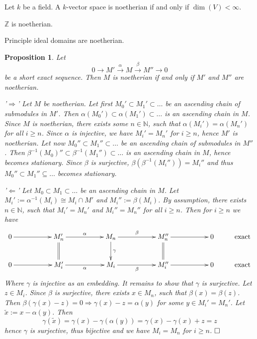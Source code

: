 \documentclass[11pt]{book}
\newtheorem{proposition}[theorem]{Proposition}
\theoremstyle{nonumberbreak}
\newenvironment{pr}[1][]{\ifthenelse{\equal{#1}{}}{\proof}{\proof[#1]}\rm}{\endproof}
\newenvironment{ex}[1][]{\ifthenelse{\equal{#1}{}}{\example}{\example[#1]}\rm}{\endexample}
\begin{document}
\begin{spacing}{1.3}
\begin{ex}
\begin{compactenum}
\item Let $k$ be a field. A $k$-vector space is noetherian if and only if $\dim(V)<\infty$. 
\item $\mathbb{Z}$ is noetherian.
\item Principle ideal domains are noetherian.
\end{compactenum}
\end{ex}

\begin{proposition} %
Let 
$$ 0 \longrightarrow M' \overset{\alpha}{\longrightarrow} M \overset{\beta}{\longrightarrow} M'' \longrightarrow 0$$
be a short exact sequence. Then $M$ is noetherian if and only if $M'$ and $M''$ are noetherian.\\
\begin{pr}
\begin{compactitem}
\item['$\Rightarrow$']Let $M$ be noetherian.
Let first $M_0' \subset M_1' \subset \ldots $ be an ascending chain of submodules in $M'$. Then $\alpha(M_0') \subset \alpha(M_1') \subset \ldots $ is an ascending chain in $M$. Since $M$ is noetherian, there exists some $n \in \mathbb{N}$, such that $\alpha(M_i')=\alpha(M_n')$ for all $i \geqslant n$. Since $\alpha$ is injective, we have $M_i'=M_n'$ for $i \geqslant n$, hence $M'$ is noetherian.
Let now $M_0'' \subset M_1'' \subset \ldots$ be an ascending chain of submodules in $M''$. Then $\beta^{-1}(M_0)'' \subset \beta^{-1}(M_1'') \subset \ldots$ is an ascending chain in $M$, hence becomes stationary. Since $\beta$ is surjective, $\beta\left(\beta^{-1}(M_i'')\right)=M_i''$ and thus $M_0'' \subset M_1'' \subseteq \ldots $ becomes stationary.
\item['$\Leftarrow$'] Let $M_0 \subset M_1 \subset \ldots $ be an ascending chain in $M$.
Let $M_i':= \alpha^{-1}(M_i) \cong M_i \cap M'$ and $M_i'' := \beta(M_i)$. By assumption, there exists $n \in \mathbb{N}$, such that $M_i'=M_n'$ and $M_i'' = M_n''$ for all $i \geqslant n$. Then for $i \geqslant n$ we have
$$\begin{xy}
\xymatrix{
0 \ar[rr] && M_n' \ar[rr]^{\alpha} \ar@2{-}[d] && M_n \ar[rr]^{\beta} \ar[d]^{\gamma} && M_n'' \ar[rr] \ar@2{-}[d] && 0 &  \textrm{exact} \\ 0 \ar[rr] && M_i' \ar[rr]_{\alpha} && M_i \ar[rr]_{\beta} && M_i'' \ar[rr] && 0 & \textrm{exact}
}
\end{xy}$$
Where $\gamma$ is injective as an embedding. It remains to show that $\gamma$ is surjective.
Let $z \in M_i$. Since $\beta$ is surjective, there exists $x \in M_n$, such that $\beta(x)=\beta(z)$.
Then $\beta\left(\gamma(x)-z\right)=0 \Rightarrow \gamma(x)-z = \alpha(y)$ for some $y \in M_i'=M_n'$. Let $\tilde{x}:=x - \alpha(y)$. Then
$$\gamma(\tilde{x})= \gamma(x)- \gamma\left(\alpha(y)\right)=\gamma(x)-\gamma(x)+z=z$$
hence $\gamma$ is surjective, thus bijective and we have $M_i=M_n$ for $i \geqslant n$. $\hfill \Box$
\end{compactitem}
\end{pr}
\end{proposition}


\end{spacing}
\end{document}
